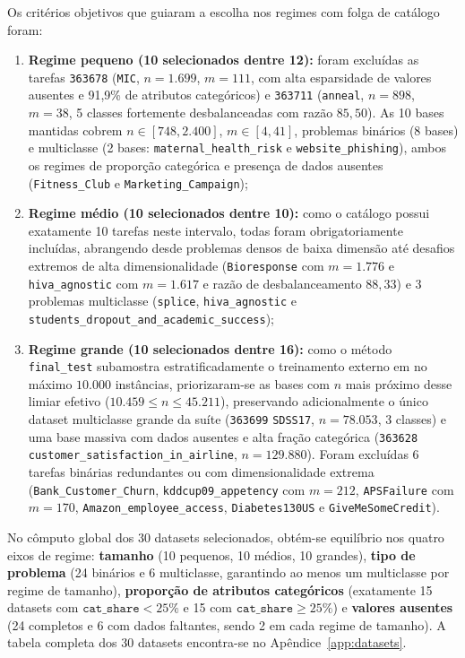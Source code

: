 \documentclass[11pt,a4paper]{article}
\begin{document}
Os critérios objetivos que guiaram a escolha nos regimes com folga de catálogo foram:
\begin{enumerate}[leftmargin=2em]
    \item \textbf{Regime pequeno (10 selecionados dentre 12):} foram excluídas as tarefas \texttt{363678} (\texttt{MIC}, $n = 1.699$, $m = 111$, com alta esparsidade de valores ausentes e 91,9\% de atributos categóricos) e \texttt{363711} (\texttt{anneal}, $n = 898$, $m = 38$, 5 classes fortemente desbalanceadas com razão $85{,}50$). As 10 bases mantidas cobrem $n \in [748, 2.400]$, $m \in [4, 41]$, problemas binários (8 bases) e multiclasse (2 bases: \texttt{maternal\_health\_risk} e \texttt{website\_phishing}), ambos os regimes de proporção categórica e presença de dados ausentes (\texttt{Fitness\_Club} e \texttt{Marketing\_Campaign});
    \item \textbf{Regime médio (10 selecionados dentre 10):} como o catálogo possui exatamente 10 tarefas neste intervalo, todas foram obrigatoriamente incluídas, abrangendo desde problemas densos de baixa dimensão até desafios extremos de alta dimensionalidade (\texttt{Bioresponse} com $m = 1.776$ e \texttt{hiva\_agnostic} com $m = 1.617$ e razão de desbalanceamento $88{,}33$) e 3 problemas multiclasse (\texttt{splice}, \texttt{hiva\_agnostic} e \texttt{students\_dropout\_and\_academic\_success});
    \item \textbf{Regime grande (10 selecionados dentre 16):} como o método \texttt{final\_test} subamostra estratificadamente o treinamento externo em no máximo $10.000$ instâncias, priorizaram-se as bases com $n$ mais próximo desse limiar efetivo ($10.459 \le n \le 45.211$), preservando adicionalmente o único dataset multiclasse grande da suíte (\texttt{363699} \texttt{SDSS17}, $n = 78.053$, 3 classes) e uma base massiva com dados ausentes e alta fração categórica (\texttt{363628} \texttt{customer\_satisfaction\_in\_airline}, $n = 129.880$). Foram excluídas 6 tarefas binárias redundantes ou com dimensionalidade extrema (\texttt{Bank\_Customer\_Churn}, \texttt{kddcup09\_appetency} com $m = 212$, \texttt{APSFailure} com $m = 170$, \texttt{Amazon\_employee\_access}, \texttt{Diabetes130US} e \texttt{GiveMeSomeCredit}).
\end{enumerate}

No cômputo global dos 30 datasets selecionados, obtém-se equilíbrio nos quatro eixos de regime: \textbf{tamanho} (10 pequenos, 10 médios, 10 grandes), \textbf{tipo de problema} (24 binários e 6 multiclasse, garantindo ao menos um multiclasse por regime de tamanho), \textbf{proporção de atributos categóricos} (exatamente 15 datasets com $\texttt{cat\_share} < 25\%$ e 15 com $\texttt{cat\_share} \ge 25\%$) e \textbf{valores ausentes} (24 completos e 6 com dados faltantes, sendo 2 em cada regime de tamanho). A tabela completa dos 30 datasets encontra-se no Apêndice~\ref{app:datasets}.
\end{document}
